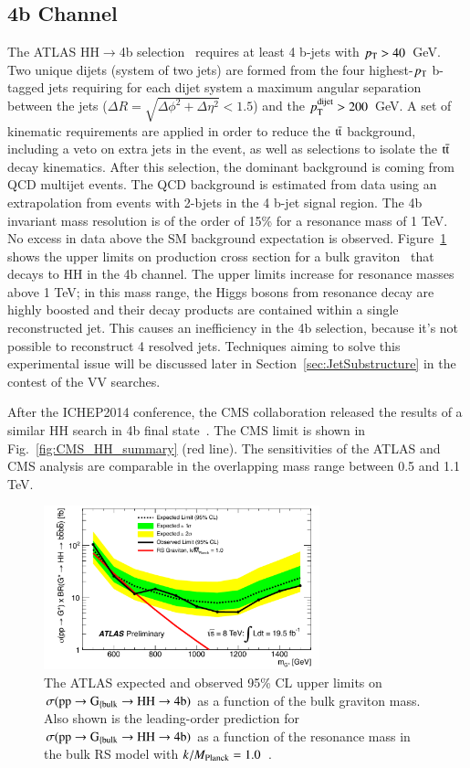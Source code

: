 \documentclass[3p,times,twocolumn]{elsarticle}
\begin{document}
\subsection{4b Channel}
The ATLAS HH$\rightarrow$4b selection~\cite{Aad:2014yja} requires at least 4 b-jets with
$p_{\rm{T}}>40$~GeV. Two unique dijets (system of two jets) are formed
from the four highest-$p_{\rm{T}}$ b-tagged jets requiring for each
dijet system a maximum angular separation between the jets
($\Delta R=\sqrt{\Delta\phi^2+\Delta\eta^2}<1.5$)
and the $p_{\rm{T}}^{\rm{dijet}}>200$~GeV. A set of kinematic
requirements are applied in order to reduce the $\rm{t}\bar{\rm{t}}$
background, including a veto on extra jets in the event, as well as 
selections to isolate the $\rm{t}\bar{\rm{t}}$ decay kinematics.
After this selection, the dominant background is coming from QCD
multijet events. The QCD background is estimated from data using an
extrapolation from events with 2-bjets in the 4 b-jet signal
region. The 4b invariant mass resolution is of the order of 15\% for a
resonance mass of 1 TeV. No excess in data above the SM background
expectation is observed. Figure~\ref{fig:ATLAS_HH_4b_limit} shows the upper limits 
on production cross section for a bulk graviton~\cite{Agashe:2007zd} that decays to
HH in the 4b channel. The upper limits increase for resonance masses
above 1 TeV; in this mass range, the Higgs bosons from resonance decay
are highly boosted and their decay products are contained within a
single reconstructed jet. This causes an inefficiency in the 4b
selection, because it's not possible to reconstruct 4 resolved jets. 
Techniques aiming to solve this experimental issue will be discussed
later in Section~\ref{sec:JetSubstructure} in the contest of the VV searches. 

After the ICHEP2014 conference, the CMS collaboration released the
results of a similar HH search in 4b final state~\cite{CMS:2014eda}. The CMS
limit is shown in Fig.~\ref{fig:CMS_HH_summary} (red line). 
The sensitivities of the ATLAS and CMS analysis are comparable in the 
overlapping mass range between 0.5 and 1.1 TeV.

\begin{figure}[htbp]
\centering
\includegraphics[width=8cm]{ATLAS_HH_4b_limit.pdf}
\caption{The ATLAS expected and observed 95\% CL upper limits on
  $\sigma(\rm{pp} \rightarrow \rm{G}_{\{bulk} \rightarrow \rm{HH} \rightarrow 4b)$  
as a function of the bulk graviton mass. Also shown is the
  leading-order prediction for $\sigma(\rm{pp}\rightarrow \rm{G}_{\{bulk} \rightarrow \rm{HH} \rightarrow 4b)$ 
as a function of the resonance mass in the bulk RS model with
$k/M_{\rm{Planck}} = 1.0$~\cite{Aad:2014yja}.}\label{fig:ATLAS_HH_4b_limit}
\end{figure}
\end{document}
